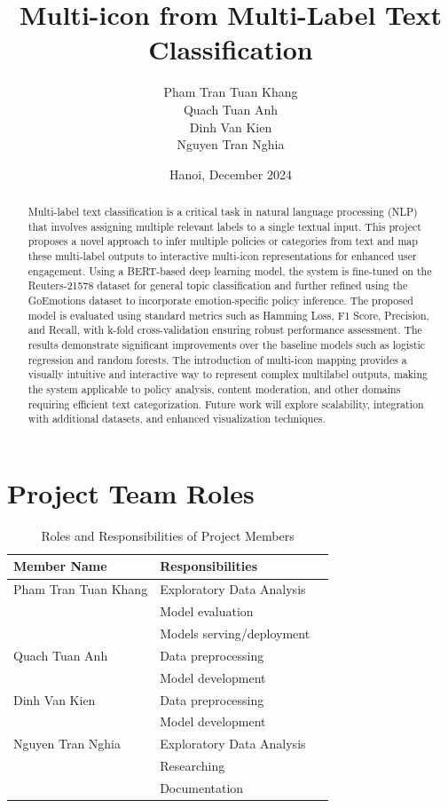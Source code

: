 \documentclass{article}
\title{Multi-icon from Multi-Label Text Classification}
\author{
Pham Tran Tuan Khang\\
Quach Tuan Anh\\
Dinh Van Kien\\
Nguyen Tran Nghia
}
\date{Hanoi, December 2024}
\begin{document}
\maketitle
\begin{abstract}
Multi-label text classification is a critical task in natural language processing (NLP) that involves assigning multiple relevant labels to a single textual input. This project proposes a novel approach to infer multiple policies or categories from text and map these multi-label outputs to interactive multi-icon representations for enhanced user engagement. Using a BERT-based deep learning model, the system is fine-tuned on the Reuters-21578 dataset for general topic classification and further refined using the GoEmotions dataset to incorporate emotion-specific policy inference. The proposed model is evaluated using standard metrics such as Hamming Loss, F1 Score, Precision, and Recall, with k-fold cross-validation ensuring robust performance assessment. The results demonstrate significant improvements over the baseline models such as logistic regression and random forests. The introduction of multi-icon mapping provides a visually intuitive and interactive way to represent complex multilabel outputs, making the system applicable to policy analysis, content moderation, and other domains requiring efficient text categorization. Future work will explore scalability, integration with additional datasets, and enhanced visualization techniques.
\end{abstract}

\tableofcontents
\section*{Project Team Roles}
\begin{table}[h!]
    \centering
    \renewcommand{\arraystretch}{1.3} %
    \begin{tabular}{| m{5cm} | m{5cm} | m{7cm} |}
        \hline
        \textbf{Member Name} & \textbf{Responsibilities} \\ 
        \hline
        Pham Tran Tuan Khang  & Exploratory Data Analysis \\ & Model evaluation \\ & Models serving/deployment \\ 
        \hline
        Quach Tuan Anh & Data preprocessing \\ & Model development \\
        \hline
        Dinh Van Kien & Data preprocessing  \\ & Model development \\ 
        \hline
        Nguyen Tran Nghia & Exploratory Data Analysis \\ & Researching \\ & Documentation \\
        \hline
    \end{tabular}
    \caption{Roles and Responsibilities of Project Members}
    \label{tab:team_roles}
\end{table}
\end{document}
